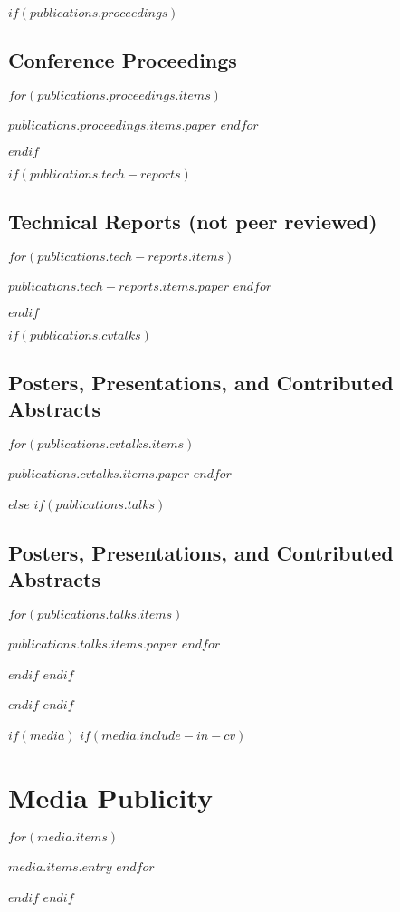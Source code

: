 \documentclass[letterpaper,10pt,final]{moderncv}
\begin{document}
$if(publications.proceedings)$
\subsection{Conference Proceedings}
\vspace*{0.25em}
\begin{list}{}{\leftmargin=1em \itemindent=-1em \itemsep=0.25em}
$for(publications.proceedings.items)$
\item $publications.proceedings.items.paper$
$endfor$
\end{list}
$endif$

$if(publications.tech-reports)$
\subsection{Technical Reports (not peer reviewed)}
\vspace*{0.25em}
\begin{list}{}{\leftmargin=1em \itemindent=-1em \itemsep=0.25em}
$for(publications.tech-reports.items)$
\item $publications.tech-reports.items.paper$
$endfor$
\end{list}
$endif$

$if(publications.cvtalks)$
\subsection{Posters, Presentations, and Contributed Abstracts}
\vspace*{0.25em}
\begin{list}{}{\leftmargin=1em \itemindent=-1em \itemsep=0.25em}
$for(publications.cvtalks.items)$
\item $publications.cvtalks.items.paper$
$endfor$
\end{list}
$else$
$if(publications.talks)$
\subsection{Posters, Presentations, and Contributed Abstracts}
\vspace*{0.25em}
\begin{list}{}{\leftmargin=1em \itemindent=-1em \itemsep=0.25em}
$for(publications.talks.items)$
\item $publications.talks.items.paper$
$endfor$
\end{list}
$endif$
$endif$

$endif$
$endif$

$if(media)$
$if(media.include-in-cv)$
\section{Media Publicity}
\begin{list}{}{\leftmargin=1em \itemindent=-1em \itemsep=0.25em}
$for(media.items)$
\item $media.items.entry$
$endfor$
\end{list}
$endif$
$endif$
\end{document}
